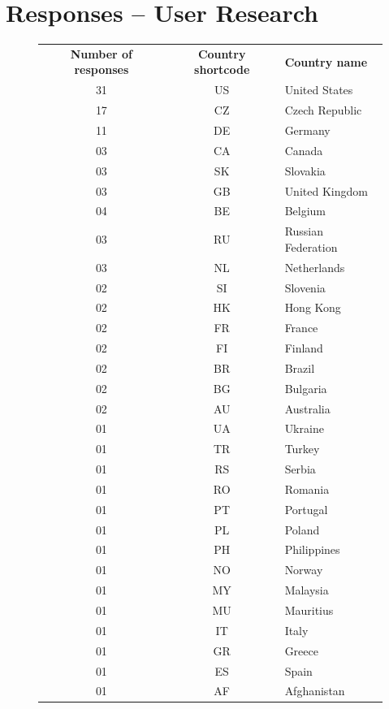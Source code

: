 \documentclass[
  printed, %
  table,   %
  lof,     %
  lot,     %
           oneside, color
]{fithesis3}
\begin{document}
\chapter{Responses -- User Research}
\vspace{-1em}
\begin{figure}[H]
\center
\begin{footnotesize}
\begin{tabular}{ccl}
\textbf{Number of responses} & \textbf{Country shortcode} & \textbf{Country name} \\
31 & US & United States      \\
17 & CZ & Czech Republic     \\
11 & DE & Germany            \\
03  & CA & Canada             \\
03  & SK & Slovakia           \\
03  & GB & United Kingdom     \\
04  & BE & Belgium            \\
03  & RU & Russian Federation \\
03  & NL & Netherlands        \\
02  & SI & Slovenia           \\
02  & HK & Hong Kong          \\
02  & FR & France             \\
02  & FI & Finland            \\
02  & BR & Brazil             \\
02  & BG & Bulgaria           \\
02  & AU & Australia          \\
01  & UA & Ukraine            \\
01  & TR & Turkey             \\
01  & RS & Serbia             \\
01  & RO & Romania            \\
01  & PT & Portugal           \\
01  & PL & Poland             \\
01  & PH & Philippines        \\
01  & NO & Norway             \\
01  & MY & Malaysia           \\
01  & MU & Mauritius          \\
01  & IT & Italy              \\
01  & GR & Greece             \\
01  & ES & Spain              \\
01  & AF & Afghanistan       
\end{tabular}
\end{footnotesize}
\label{table:countries}
\end{figure}
\end{document}
